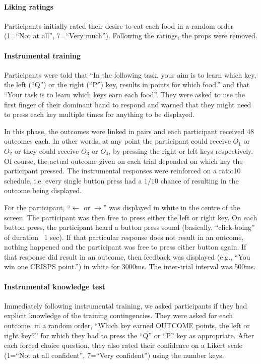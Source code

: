 \documentclass[12pt]{article}
\begin{document}
\paragraph{Liking ratings} Participants initially rated their desire to eat
each food in a random order (1=``Not at all'', 7=``Very much''). Following the
ratings, the props were removed. 

\paragraph{Instrumental training} Participants were told that ``In the
following task, your aim is to learn which key, the left (``Q'') or the right
(``P'') key, results in points for which food.'' and that ``Your task is to
learn which keys earn each food''. They were asked to use the first finger of
their dominant hand to respond and warned that they might need to press each
key multiple times for anything to be displayed. 

In this phase, the outcomes were linked in pairs and each participant
received 48 outcomes each. In other words, at any point the participant could
receive $O_1$ or $O_2$ or they could receive $O_3$ or $O_4$, by pressing the
right or left keys respectively. Of course, the actual outcome given on each
trial depended on which key the participant pressed. The instrumental responses
were reinforced on a ratio10 schedule, i.e. every single button press had a
$1/10$ chance of resulting in the outcome being displayed.

For the participant, ``$\leftarrow$ or $\rightarrow$'' was displayed in
white in the centre of the screen. The participant was then free to press
either the left or right key. On each button press, the participant heard a
button press sound (basically, ``click-boing'' of duration ~1 sec). If that
particular response does not result in an outcome, nothing happened and the
participant was free to press either button again. If that response did result
in an outcome, then feedback was displayed (e.g., ``You win one CRISPS
point.'') in white for 3000ms. The inter-trial interval was 500ms.

\paragraph{Instrumental knowledge test}
Immediately following instrumental training, we asked participants if they had
explicit knowledge of the training contingencies. They were asked for each
outcome, in a random order, ``Which key earned OUTCOME points, the left or
right key?'' for which they had to press the ``Q'' or ``P'' key as appropriate.
After each forced choice question, they also rated their confidence on a Likert
scale (1=``Not at all confident'', 7=``Very confident'') using the number keys.
\end{document}
